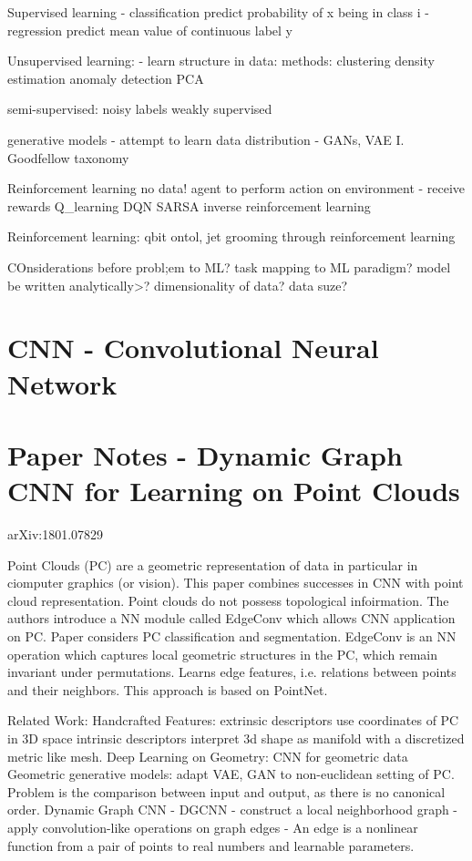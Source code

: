 Supervised learning
 - classification
    predict probability of x being in class i 
- regression
predict mean value of continuous label y

Unsupervised learning:
 - learn structure in data:
methods:
clustering
density estimation
anomaly detection
PCA

semi-supervised: 
noisy labels
weakly supervised

generative models
- attempt to learn data distribution
- GANs, VAE
I. Goodfellow taxonomy

Reinforcement learning
no data!
agent to perform action on environment - receive rewards
Q_learning
DQN
SARSA
inverse reinforcement learning


Reinforcement learning: qbit ontol, jet grooming through reinforcement learning

COnsiderations before probl;em to ML?
task mapping to ML paradigm?
model be written analytically>?
dimensionality of data?
data suze?


\section{CNN - Convolutional Neural Network}


\section{Paper Notes - Dynamic Graph CNN for Learning on Point Clouds}
arXiv:1801.07829

Point Clouds (PC) are a geometric representation of data in particular in ciomputer
graphics (or vision). This paper combines successes in CNN with point cloud representation.
Point clouds do not possess topological infoirmation. The authors introduce a NN
module called EdgeConv which allows CNN application on PC.
Paper considers PC classification and segmentation. 
EdgeConv is an NN operation which captures local geometric structures in the PC,
which remain invariant under permutations. Learns edge features, i.e. relations
between points and their neighbors. This approach is based on PointNet.

Related Work:
Handcrafted Features:
extrinsic descriptors use coordinates of PC in 3D space
intrinsic descriptors interpret 3d shape as manifold with a discretized metric
like mesh.
Deep Learning on Geometry: CNN for geometric data
Geometric generative models: adapt VAE, GAN to non-euclidean setting of PC.
Problem is the comparison between input and output, as there is no canonical
order.
Dynamic Graph CNN - DGCNN
- construct a local neighborhood graph
- apply convolution-like operations on graph edges
- An edge is a nonlinear function from a pair of points to real numbers and
learnable parameters.

